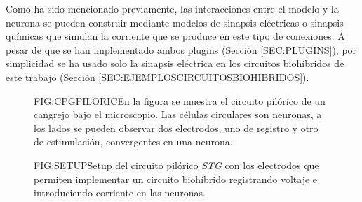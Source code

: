 Como ha sido mencionado previamente, las interacciones entre el modelo y la neurona se pueden construir mediante modelos de sinapsis eléctricas o sinapsis químicas que simulan la corriente que se produce en este tipo de conexiones. A pesar de que se han implementado ambos plugins (Sección \ref{SEC:PLUGINS}), por simplicidad se ha usado solo la sinapsis eléctrica en los circuitos biohíbridos de este trabajo (Sección \ref{SEC:EJEMPLOSCIRCUITOSBIOHIBRIDOS}).

\begin{figure}[CPG pilorico]{FIG:CPGPILORIC}{En la figura se muestra el circuito pilórico de un cangrejo bajo el microscopio. Las células circulares son neuronas, a los lados se pueden observar dos electrodos, uno de registro y otro de estimulación, convergentes en una neurona.}
\end{figure}

\begin{figure}[Setup de electrodos intra y extracelulares]{FIG:SETUP}{Setup del circuito pilórico \textit{STG} con los electrodos que permiten implementar un circuito biohíbrido registrando voltaje e introduciendo corriente en las neuronas.}
\end{figure}


